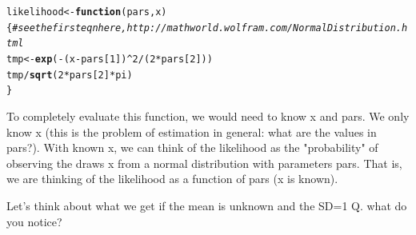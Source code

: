 \documentclass[letterpaper,12pt]{article}\usepackage[]{graphicx}\usepackage[]{color}
\makeatletter
\newcommand{\hlnum}[1]{\textcolor[rgb]{0.686,0.059,0.569}{#1}}%
\newcommand{\hlcom}[1]{\textcolor[rgb]{0.678,0.584,0.686}{\textit{#1}}}%
\newcommand{\hlopt}[1]{\textcolor[rgb]{0,0,0}{#1}}%
\newcommand{\hlstd}[1]{\textcolor[rgb]{0.345,0.345,0.345}{#1}}%
\newcommand{\hlkwa}[1]{\textcolor[rgb]{0.161,0.373,0.58}{\textbf{#1}}}%
\newcommand{\hlkwb}[1]{\textcolor[rgb]{0.69,0.353,0.396}{#1}}%
\newcommand{\hlkwc}[1]{\textcolor[rgb]{0.333,0.667,0.333}{#1}}%
\newcommand{\hlkwd}[1]{\textcolor[rgb]{0.737,0.353,0.396}{\textbf{#1}}}%
\newenvironment{kframe}{%
 \def\at@end@of@kframe{}%
 \ifinner\ifhmode%
  \def\at@end@of@kframe{\end{minipage}}%
  \begin{minipage}{\columnwidth}%
 \fi\fi%
 \def\FrameCommand##1{\hskip\@totalleftmargin \hskip-\fboxsep
 \colorbox{shadecolor}{##1}\hskip-\fboxsep
     \hskip-\linewidth \hskip-\@totalleftmargin \hskip\columnwidth}%
 \MakeFramed {\advance\hsize-\width
   \@totalleftmargin\z@ \linewidth\hsize
   \@setminipage}}%
 {\par\unskip\endMakeFramed%
 \at@end@of@kframe}
\newenvironment{knitrout}{}{} %
\numberwithin{equation}{section}
\makeatother
\begin{document}
\begin{knitrout}
\color{fgcolor}\begin{kframe}
\begin{alltt}
\hlstd{likelihood}\hlkwb{<-}\hlkwa{function}\hlstd{(}\hlkwc{pars}\hlstd{,}\hlkwc{x}\hlstd{) \{} \hlcom{#see the first eqn here, http://mathworld.wolfram.com/NormalDistribution.html}
    \hlstd{tmp}\hlkwb{<-}\hlkwd{exp}\hlstd{(}\hlopt{-}\hlstd{(x}\hlopt{-}\hlstd{pars[}\hlnum{1}\hlstd{])}\hlopt{^}\hlnum{2}\hlopt{/}\hlstd{(}\hlnum{2}\hlopt{*}\hlstd{pars[}\hlnum{2}\hlstd{]))}
    \hlstd{tmp}\hlopt{/}\hlkwd{sqrt}\hlstd{(}\hlnum{2}\hlopt{*}\hlstd{pars[}\hlnum{2}\hlstd{]}\hlopt{*}\hlstd{pi)}
\hlstd{\}}
\end{alltt}
\end{kframe}
\end{knitrout}

To completely evaluate this function, we would need to know x and pars. We only know x (this is the problem of estimation in general: what are the values in pars?).
With known x, we can think of the likelihood as the "probability" of observing the draws x from a normal distribution with parameters pars.
That is, we are thinking of the likelihood as a function of pars (x is known).

Let's think about what we get if the mean is unknown and the SD=1
Q. what do you notice? 
\end{document}
